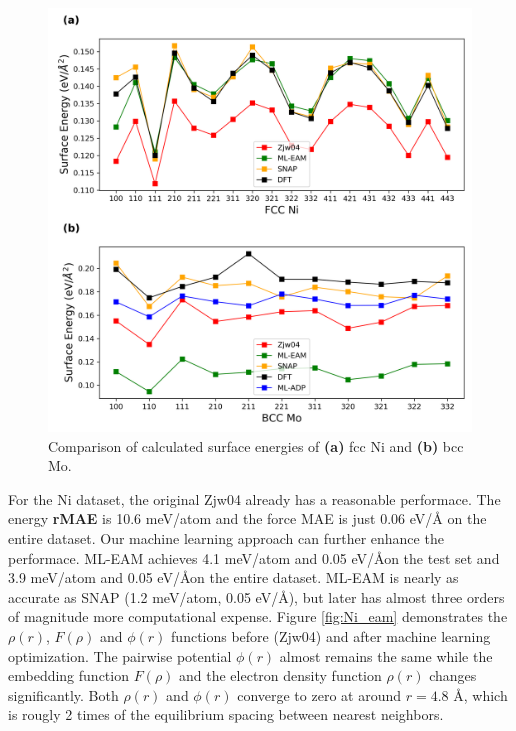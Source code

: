 \documentclass[final,3p,times]{elsarticle}
\begin{document}
% 
%
\begin{figure}
\centering
\includegraphics[scale=0.4]{surface_energy.png}
\caption{\label{fig:surface_energy} Comparison of calculated surface energies of 
\textbf{(a)} fcc Ni and \textbf{(b)} bcc Mo.}
\end{figure}

For the Ni dataset, the original Zjw04 already has a reasonable performace. 
The energy \textbf{rMAE} is 10.6 meV/atom and the force MAE is just 0.06 eV/\AA 
on the entire dataset. Our machine learning approach can further enhance the 
performace. ML-EAM achieves 4.1 meV/atom and 0.05 eV/\AA on the test set and 
3.9 meV/atom and 0.05 eV/\AA on the entire dataset. ML-EAM is nearly as accurate 
as SNAP (1.2 meV/atom, 0.05 eV/\AA), but later has almost three orders of 
magnitude more computational expense. Figure \ref{fig:Ni_eam} demonstrates the 
$\rho(r)$, $F(\rho)$ and $\phi(r)$ functions before (Zjw04) and after machine 
learning optimization. The pairwise potential $\phi(r)$ almost remains the same 
while the embedding function $F(\rho)$ and the electron density function 
$\rho(r)$ changes significantly. Both $\rho(r)$ and $\phi(r)$ converge to zero 
at around $r=4.8$ \AA, which is rougly 2 times of the equilibrium spacing 
between nearest neighbors.
\end{document}
